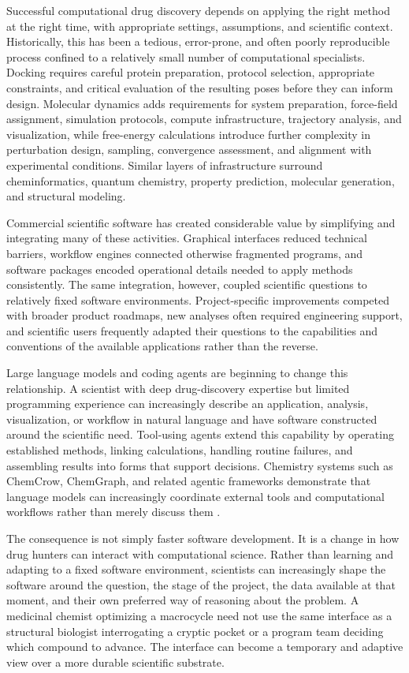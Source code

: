 \documentclass[11pt]{article}
\begin{document}
Successful computational drug discovery depends on applying the right method at the right time, with appropriate settings, assumptions, and scientific context. Historically, this has been a tedious, error-prone, and often poorly reproducible process confined to a relatively small number of computational specialists. Docking requires careful protein preparation, protocol selection, appropriate constraints, and critical evaluation of the resulting poses before they can inform design. Molecular dynamics adds requirements for system preparation, force-field assignment, simulation protocols, compute infrastructure, trajectory analysis, and visualization, while free-energy calculations introduce further complexity in perturbation design, sampling, convergence assessment, and alignment with experimental conditions. Similar layers of infrastructure surround cheminformatics, quantum chemistry, property prediction, molecular generation, and structural modeling.

Commercial scientific software has created considerable value by simplifying and integrating many of these activities. Graphical interfaces reduced technical barriers, workflow engines connected otherwise fragmented programs, and software packages encoded operational details needed to apply methods consistently. The same integration, however, coupled scientific questions to relatively fixed software environments. Project-specific improvements competed with broader product roadmaps, new analyses often required engineering support, and scientific users frequently adapted their questions to the capabilities and conventions of the available applications rather than the reverse.

Large language models and coding agents are beginning to change this relationship. A scientist with deep drug-discovery expertise but limited programming experience can increasingly describe an application, analysis, visualization, or workflow in natural language and have software constructed around the scientific need. Tool-using agents extend this capability by operating established methods, linking calculations, handling routine failures, and assembling results into forms that support decisions. Chemistry systems such as ChemCrow, ChemGraph, and related agentic frameworks demonstrate that language models can increasingly coordinate external tools and computational workflows rather than merely discuss them \citep{bran2024chemcrow,boiko2023coscientist,pham2026chemgraph,macknight2025rethinking}.

The consequence is not simply faster software development. It is a change in how drug hunters can interact with computational science. Rather than learning and adapting to a fixed software environment, scientists can increasingly shape the software around the question, the stage of the project, the data available at that moment, and their own preferred way of reasoning about the problem. A medicinal chemist optimizing a macrocycle need not use the same interface as a structural biologist interrogating a cryptic pocket or a program team deciding which compound to advance. The interface can become a temporary and adaptive view over a more durable scientific substrate.
\end{document}
